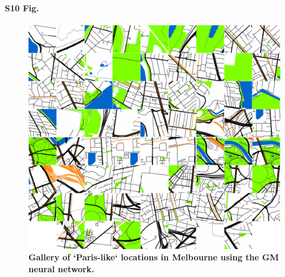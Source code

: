 \documentclass[10pt,letterpaper]{article}
\begin{document}
\paragraph*{S10 Fig.}
\begin{figure}[!htbp]
\centering   
\includegraphics[scale=0.14]{Images/PlosOne/Fig10.png}   
\caption{\bf Gallery of `Paris-like` locations in Melbourne using the GM neural network.}    
 \label{fig:gm_mel_gallery} 
\end{figure} 
\end{document}

